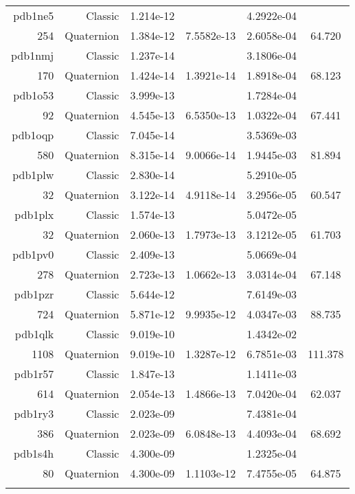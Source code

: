 \begin{xltabular}{\textwidth}{r|rS[table-format=1.3e+2]S[table-format=1.4e+2]S[table-format=1.4e+2]S[table-format=-1.3]}
pdb1ne5 & Classic & 1.214e-12 &  & 4.2922e-04 & \\
254 & Quaternion & 1.384e-12 & 7.5582e-13 & 2.6058e-04 & 64.720\\  \addlinespace
pdb1nmj & Classic & 1.237e-14 &  & 3.1806e-04 & \\
170 & Quaternion & 1.424e-14 & 1.3921e-14 & 1.8918e-04 & 68.123\\  \addlinespace
pdb1o53 & Classic & 3.999e-13 &  & 1.7284e-04 & \\
92 & Quaternion & 4.545e-13 & 6.5350e-13 & 1.0322e-04 & 67.441\\  \addlinespace
pdb1oqp & Classic & 7.045e-14 &  & 3.5369e-03 & \\
580 & Quaternion & 8.315e-14 & 9.0066e-14 & 1.9445e-03 & 81.894\\  \addlinespace
pdb1plw & Classic & 2.830e-14 &  & 5.2910e-05 & \\
32 & Quaternion & 3.122e-14 & 4.9118e-14 & 3.2956e-05 & 60.547\\  \addlinespace
pdb1plx & Classic & 1.574e-13 &  & 5.0472e-05 & \\
32 & Quaternion & 2.060e-13 & 1.7973e-13 & 3.1212e-05 & 61.703\\  \addlinespace
pdb1pv0 & Classic & 2.409e-13 &  & 5.0669e-04 & \\
278 & Quaternion & 2.723e-13 & 1.0662e-13 & 3.0314e-04 & 67.148\\  \addlinespace
pdb1pzr & Classic & 5.644e-12 &  & 7.6149e-03 & \\
724 & Quaternion & 5.871e-12 & 9.9935e-12 & 4.0347e-03 & 88.735\\  \addlinespace
pdb1qlk & Classic & 9.019e-10 &  & 1.4342e-02 & \\
1108 & Quaternion & 9.019e-10 & 1.3287e-12 & 6.7851e-03 & 111.378\\  \addlinespace
pdb1r57 & Classic & 1.847e-13 &  & 1.1411e-03 & \\
614 & Quaternion & 2.054e-13 & 1.4866e-13 & 7.0420e-04 & 62.037\\  \addlinespace
pdb1ry3 & Classic & 2.023e-09 &  & 7.4381e-04 & \\
386 & Quaternion & 2.023e-09 & 6.0848e-13 & 4.4093e-04 & 68.692\\  \addlinespace
pdb1s4h & Classic & 4.300e-09 &  & 1.2325e-04 & \\
80 & Quaternion & 4.300e-09 & 1.1103e-12 & 7.4755e-05 & 64.875\\  \addlinespace

\end{xltabular}
